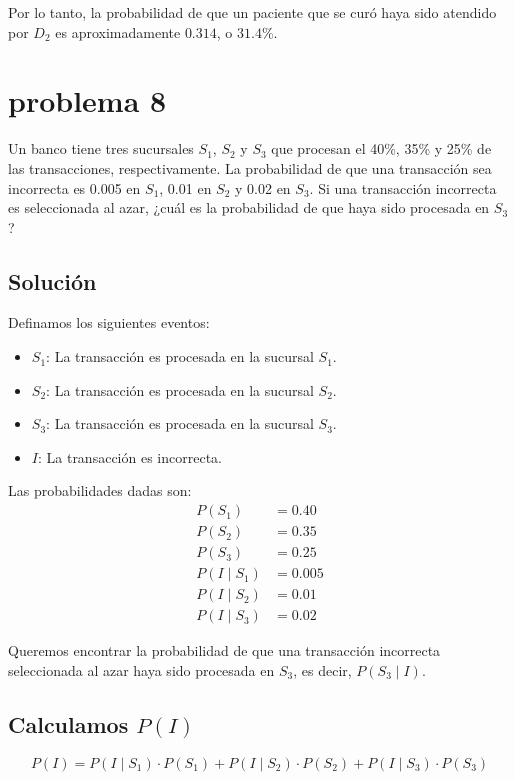\documentclass[12pt,a4paper]{article}
\begin{document}
Por lo tanto, la probabilidad de que un paciente que se curó haya sido atendido por \( D_2 \) es aproximadamente \( 0.314 \), o \( 31.4\% \).

\section*{problema 8}
Un banco tiene tres sucursales \( S_1 \), \( S_2 \) y \( S_3 \) que procesan el 40\%, 35\% y 25\% de las transacciones, respectivamente. La probabilidad de que una transacción sea incorrecta es 0.005 en \( S_1 \), 0.01 en \( S_2 \) y 0.02 en \( S_3 \). Si una transacción incorrecta es seleccionada al azar, ¿cuál es la probabilidad de que haya sido procesada en \( S_3 \)?

\subsection*{Solución}

Definamos los siguientes eventos:
\begin{itemize}
    \item \( S_1 \): La transacción es procesada en la sucursal \( S_1 \).
    \item \( S_2 \): La transacción es procesada en la sucursal \( S_2 \).
    \item \( S_3 \): La transacción es procesada en la sucursal \( S_3 \).
    \item \( I \): La transacción es incorrecta.
\end{itemize}

Las probabilidades dadas son:
\begin{align*}
P(S_1) &= 0.40 \\
P(S_2) &= 0.35 \\
P(S_3) &= 0.25 \\
P(I \mid S_1) &= 0.005 \\
P(I \mid S_2) &= 0.01 \\
P(I \mid S_3) &= 0.02
\end{align*}

Queremos encontrar la probabilidad de que una transacción incorrecta seleccionada al azar haya sido procesada en \( S_3 \), es decir, \( P(S_3 \mid I) \).

\subsection*{Calculamos \( P(I) \)}

\[
P(I) = P(I \mid S_1) \cdot P(S_1) + P(I \mid S_2) \cdot P(S_2) + P(I \mid S_3) \cdot P(S_3)
\]
\end{document}
